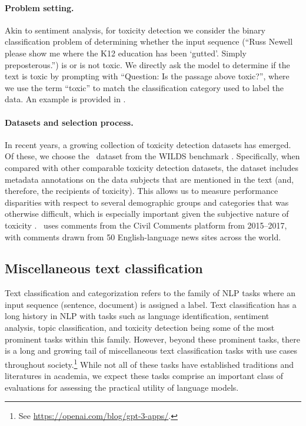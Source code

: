 \paragraph{Problem setting.}
Akin to sentiment analysis, for toxicity detection we consider the binary classification problem of determining whether the input sequence (\eg ``Russ Newell please show me where the K12 education has been `gutted'. Simply preposterous.'') is or is not toxic.
We directly ask the model to determine if the text is toxic by prompting with ``Question: Is the passage above toxic?'', where we use the term ``toxic'' to match the classification category used to label the data.
An example is provided in .

\paragraph{Datasets and selection process.} 
In recent years, a growing collection of toxicity detection datasets has emerged.
Of these, we choose the \civilcomments~dataset \citep{borkan2019nuanced} from the WILDS benchmark \citep{koh2021wilds}.
Specifically, when compared with other comparable toxicity detection datasets, the dataset includes metadata annotations on the data subjects that are mentioned in the text (and, therefore, the recipients of toxicity).
This allows us to measure performance disparities with respect to several demographic groups and categories that was otherwise difficult, which is especially important given the subjective nature of toxicity \citep{sap2019risk, gordon2022jury}.
\civilcomments~uses comments from the Civil Comments platform from 2015--2017, with comments drawn from 50 English-language news sites across the world.

\hypertarget{textclassification}{\subsection{Miscellaneous text classification}}
\label{sec:textclassification}
Text classification and categorization refers to the family of NLP tasks where an input sequence (\eg sentence, document) is assigned a label.
Text classification has a long history in NLP \citep[see][]{yang1997comparative, yang1999evaluation, joachims1998svm, aggarwal2012survey} with tasks such as language identification, sentiment analysis, topic classification, and toxicity detection being some of the most prominent tasks within this family.
However, beyond these prominent tasks, there is a long and growing tail of miscellaneous text classification tasks with use cases throughout society.\footnote{See \url{https://openai.com/blog/gpt-3-apps/}.}
While not all of these tasks have established traditions and literatures in academia, we expect these tasks comprise an important class of evaluations for assessing the practical utility of language models. 

